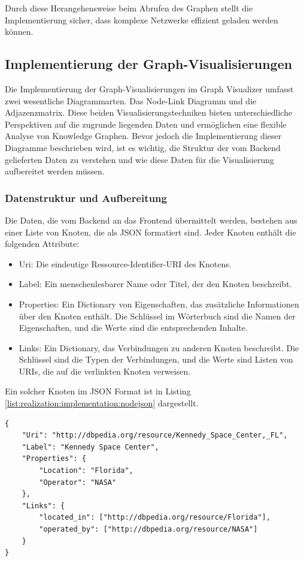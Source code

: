 Durch diese Herangehensweise beim Abrufen des Graphen stellt die Implementierung sicher, dass komplexe Netzwerke effizient geladen werden können.

\subsection{Implementierung der Graph-Visualisierungen}
\label{realization:implementation:graphDrawing}

Die Implementierung der Graph-Visualisierungen im Graph Visualizer umfasst zwei wesentliche Diagrammarten. Das Node-Link Diagramm und die Adjazenzmatrix. Diese beiden Visualisierungstechniken bieten unterschiedliche Perspektiven auf die zugrunde liegenden Daten und ermöglichen eine flexible Analyse von Knowledge Graphen. Bevor jedoch die Implementierung dieser Diagramme beschrieben wird, ist es wichtig, die Struktur der vom Backend gelieferten Daten zu verstehen und wie diese Daten für die Visualisierung aufbereitet werden müssen.

\subsubsection{Datenstruktur und Aufbereitung}

Die Daten, die vom Backend an das Frontend übermittelt werden, bestehen aus einer Liste von Knoten, die als JSON formatiert sind. Jeder Knoten enthält die folgenden Attribute:

\begin{itemize}
    \item Uri: Die eindeutige Ressource-Identifier-URI des Knotens.
    \item Label: Ein menschenlesbarer Name oder Titel, der den Knoten beschreibt.
    \item Properties: Ein Dictionary von Eigenschaften, das zusätzliche Informationen über den Knoten enthält. Die Schlüssel im Wörterbuch sind die Namen der Eigenschaften, und die Werte sind die entsprechenden Inhalte.
    \item Links: Ein Dictionary, das Verbindungen zu anderen Knoten beschreibt. Die Schlüssel sind die Typen der Verbindungen, und die Werte sind Listen von URIs, die auf die verlinkten Knoten verweisen.
\end{itemize}

Ein solcher Knoten im JSON Format ist in Listing \ref{list:realization:implementation:nodejson} dargestellt.

\begin{lstlisting}[caption={Informationen einer Node im JSON Format.}, label={list:realization:implementation:nodejson}]
{
    "Uri": "http://dbpedia.org/resource/Kennedy_Space_Center,_FL",
    "Label": "Kennedy Space Center",
    "Properties": {
        "Location": "Florida",
        "Operator": "NASA"
    },
    "Links": {
        "located_in": ["http://dbpedia.org/resource/Florida"],
        "operated_by": ["http://dbpedia.org/resource/NASA"]
    }
}
\end{lstlisting}

